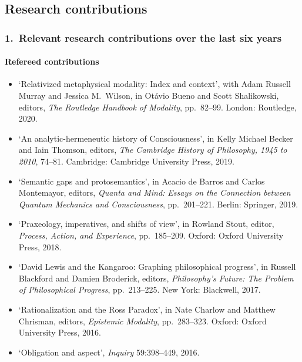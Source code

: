 \documentclass[12pt]{article}
\begin{document}
\subsection*{Research contributions}

\subsubsection*{1.\ \quad Relevant research contributions over the last six years}

\paragraph{Refereed contributions}
\begin{itemize}
	\item[] `Relativized metaphysical modality: Index and context', with Adam Russell Murray and Jessica M.\ Wilson, in Ot\'avio Bueno and Scott Shalikowski, editors, \emph{The Routledge Handbook of Modality}, pp.~82--99. London: Routledge, 2020.
	
	\item[] `An analytic-hermeneutic history of Consciousness', in Kelly Michael Becker and Iain Thomson, editors, \emph{The Cambridge History of Philosophy, 1945 to 2010}, 74--81. Cambridge: Cambridge University Press, 2019.
	
	\item[] `Semantic gaps and protosemantics', in Acacio de Barros and Carlos Montemayor, editors, \emph{Quanta and Mind: Essays on the Connection between Quantum Mechanics and Consciousness}, pp.~201--221. Berlin: Springer, 2019.
	
	\item[] `Praxeology, imperatives, and shifts of view', in Rowland Stout, editor, \emph{Process, Action, and Experience}, pp.~185--209. Oxford: Oxford University Press, 2018. 
	
	\item[] `David Lewis and the Kangaroo: Graphing philosophical progress', in Russell Blackford and Damien Broderick, editors, \emph{Philosophy's Future: The Problem of Philosophical Progress}, pp.~213--225. New York: Blackwell, 2017. 
	
	\item[] `Rationalization and the Ross Paradox', in Nate Charlow and Matthew Chrisman, editors, \emph{Epistemic Modality}, pp.~283--323. Oxford: Oxford University Press, 2016.
	
	\item[] `Obligation and aspect', \emph{Inquiry} 59:398--449, 2016.
	

\end{itemize}
\end{document}
